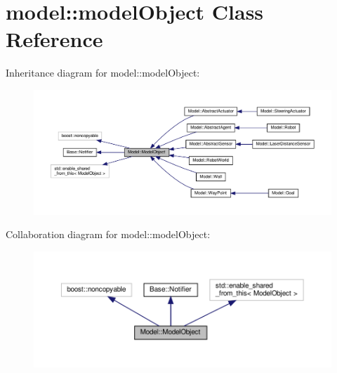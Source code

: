 \hypertarget{class_model_1_1_model_object}{}\section{model\+:\+:model\+Object Class Reference}
\label{class_model_1_1_model_object}


Inheritance diagram for model\+:\+:model\+Object\+:
\nopagebreak
\begin{figure}[H]
\begin{center}
\leavevmode
\includegraphics[width=350pt]{class_model_1_1_model_object__inherit__graph}
\end{center}
\end{figure}


Collaboration diagram for model\+:\+:model\+Object\+:
\nopagebreak
\begin{figure}[H]
\begin{center}
\leavevmode
\includegraphics[width=350pt]{class_model_1_1_model_object__coll__graph}
\end{center}
\end{figure}
